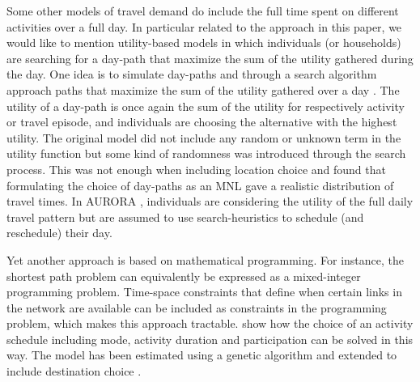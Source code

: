 %

Some other models of travel demand do include the full time spent on different activities over a full day. In particular related to the approach in this paper, we would like to mention utility-based models in which individuals (or households) are searching for a day-path that maximize the sum of the utility gathered during the day. One idea is to simulate day-paths and through a search algorithm approach paths that maximize the sum of the utility gathered over a day \citep{balmer05}. The utility of a day-path is once again the sum of the utility for respectively activity or travel episode, and individuals are choosing the alternative with the highest utility. The original model did not include any random or unknown term in the utility function but some kind of randomness was introduced through the search process. This was not enough when including location choice and \citet{horni2011} found that formulating the choice of day-paths as an MNL gave a realistic distribution of travel times. In AURORA \citep{joh2003Aurora,johEstimationAurora2005}, individuals are considering the utility of the full daily travel pattern but are assumed to use search-heuristics to schedule (and reschedule) their day. 


Yet another approach is based on mathematical programming. For instance, the shortest path problem can equivalently be expressed as a mixed-integer programming problem. Time-space constraints that define when certain links in the network are available can be included as constraints in the programming problem, which makes this approach tractable. \citet{Recker01} show how the choice of an activity schedule including mode, activity duration and participation can be solved in this way. The model has been estimated using a genetic algorithm \citep{Recker08} and extended to include destination choice \citep{Recker13}.



